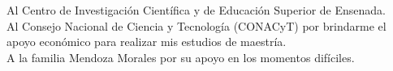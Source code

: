 
\hspace{12pt}
\bigskip

Al Centro de Investigación Científica y de Educación Superior de Ensenada.\\
\bigskip
Al Consejo Nacional de Ciencia y Tecnología (CONACyT) por brindarme el apoyo econ\'omico para realizar mis estudios de maestría.\\
\bigskip
A la familia Mendoza Morales por su apoyo en los momentos dif\'iciles.\\
